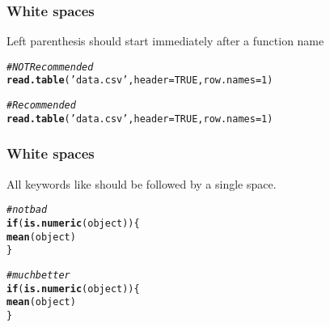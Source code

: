\documentclass[12pt]{beamer}\usepackage[]{graphicx}\usepackage[]{color}
\makeatletter
\newcommand{\hlnum}[1]{\textcolor[rgb]{0.686,0.059,0.569}{#1}}%
\newcommand{\hlstr}[1]{\textcolor[rgb]{0.192,0.494,0.8}{#1}}%
\newcommand{\hlcom}[1]{\textcolor[rgb]{0.678,0.584,0.686}{\textit{#1}}}%
\newcommand{\hlstd}[1]{\textcolor[rgb]{0.345,0.345,0.345}{#1}}%
\newcommand{\hlkwa}[1]{\textcolor[rgb]{0.161,0.373,0.58}{\textbf{#1}}}%
\newcommand{\hlkwc}[1]{\textcolor[rgb]{0.333,0.667,0.333}{#1}}%
\newcommand{\hlkwd}[1]{\textcolor[rgb]{0.737,0.353,0.396}{\textbf{#1}}}%
\newenvironment{kframe}{%
 \def\at@end@of@kframe{}%
 \ifinner\ifhmode%
  \def\at@end@of@kframe{\end{minipage}}%
  \begin{minipage}{\columnwidth}%
 \fi\fi%
 \def\FrameCommand##1{\hskip\@totalleftmargin \hskip-\fboxsep
 \colorbox{shadecolor}{##1}\hskip-\fboxsep
     \hskip-\linewidth \hskip-\@totalleftmargin \hskip\columnwidth}%
 \MakeFramed {\advance\hsize-\width
   \@totalleftmargin\z@ \linewidth\hsize
   \@setminipage}}%
 {\par\unskip\endMakeFramed%
 \at@end@of@kframe}
\newenvironment{knitrout}{}{} %
\makeatother
\begin{document}
\begin{frame}[fragile]
\frametitle{White spaces}

Left parenthesis should start immediately after a function name
\begin{knitrout}\footnotesize
{}\color{fgcolor}\begin{kframe}
\begin{alltt}
\hlcom{# NOT Recommended }
\hlkwd{read.table} \hlstd{(}\hlstr{'data.csv'}\hlstd{,} \hlkwc{header} \hlstd{=} \hlnum{TRUE}\hlstd{,} \hlkwc{row.names} \hlstd{=} \hlnum{1}\hlstd{)}

\hlcom{# Recommended }
\hlkwd{read.table}\hlstd{(}\hlstr{'data.csv'}\hlstd{,} \hlkwc{header} \hlstd{=} \hlnum{TRUE}\hlstd{,} \hlkwc{row.names} \hlstd{=} \hlnum{1}\hlstd{)}
\end{alltt}
\end{kframe}
\end{knitrout}

\end{frame}


\begin{frame}[fragile]
\frametitle{White spaces}

All keywords like  should be followed by a single space.
\begin{knitrout}\footnotesize
{}\color{fgcolor}\begin{kframe}
\begin{alltt}
\hlcom{# not bad}
\hlkwa{if}\hlstd{(}\hlkwd{is.numeric}\hlstd{(object)) \{}
  \hlkwd{mean}\hlstd{(object)}
\hlstd{\}}

\hlcom{# much better}
\hlkwa{if} \hlstd{(}\hlkwd{is.numeric}\hlstd{(object)) \{}
  \hlkwd{mean}\hlstd{(object)}
\hlstd{\}}
\end{alltt}
\end{kframe}
\end{knitrout}

\end{frame}

\end{document}
